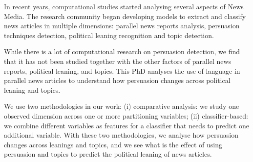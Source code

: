 In recent years, computational studies started analysing several aspects of News Media.
The research community began
developing models to extract and classify news articles in multiple dimensions: parallel news reports analysis, persuasion techniques detection, political leaning recognition and topic detection.

While there is a lot of computational research on persuasion detection, we find that it has not been studied together with the other factors of 
parallel news reports, political leaning, and topics.
%
%
This PhD analyses the use of language in parallel news articles to understand how persuasion changes across political leaning and topics.


We use two methodologies in our work:
(i) comparative analysis: we study one observed dimension across one or more partitioning variables;
(ii) classifier-based: we combine different variables as features for a classifier that needs to predict one additional variable.
With these two methodologies, we analyse how persuasion changes across leanings and topics, and we see what is the effect of using persuasion and topics to predict the political leaning of news articles. 


